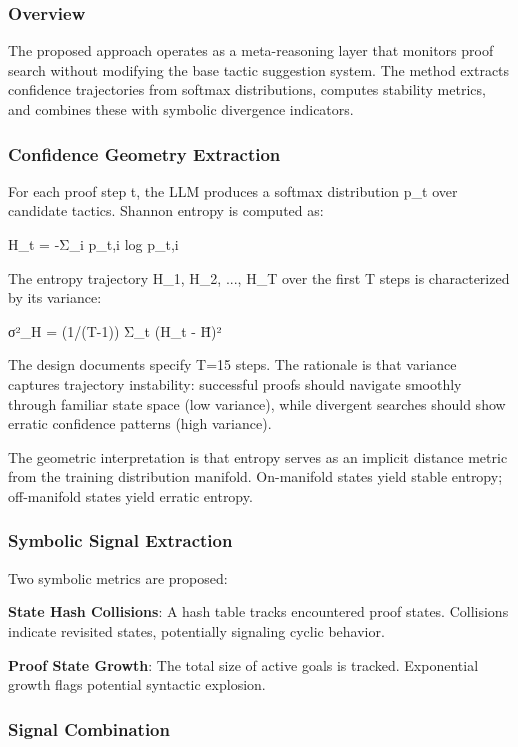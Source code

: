 
\subsubsection{Overview}

The proposed approach operates as a meta-reasoning layer that monitors proof search without modifying the base tactic suggestion system. The method extracts confidence trajectories from softmax distributions, computes stability metrics, and combines these with symbolic divergence indicators.

\subsubsection{Confidence Geometry Extraction}

For each proof step t, the LLM produces a softmax distribution p_t over candidate tactics. Shannon entropy is computed as:

H_t = -Σ_i p_{t,i} log p_{t,i}

The entropy trajectory {H_1, H_2, ..., H_T} over the first T steps is characterized by its variance:

σ²_H = (1/(T-1)) Σ_t (H_t - H̄)²

The design documents specify T=15 steps. The rationale is that variance captures trajectory instability: successful proofs should navigate smoothly through familiar state space (low variance), while divergent searches should show erratic confidence patterns (high variance).

The geometric interpretation is that entropy serves as an implicit distance metric from the training distribution manifold. On-manifold states yield stable entropy; off-manifold states yield erratic entropy.

\subsubsection{Symbolic Signal Extraction}

Two symbolic metrics are proposed:

\textbf{State Hash Collisions}: A hash table tracks encountered proof states. Collisions indicate revisited states, potentially signaling cyclic behavior.

\textbf{Proof State Growth}: The total size of active goals is tracked. Exponential growth flags potential syntactic explosion.

\subsubsection{Signal Combination}

